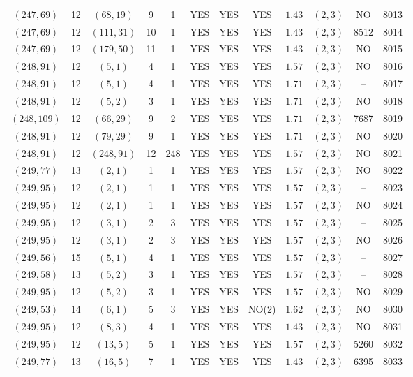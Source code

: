 \begin{longtable}{|c|c|c|c|c|c|c|c|c|c|c|c|}
$(247,69)$ & 12 & $(68,19)$ & 9 & 1 & YES & YES & YES & $1.43$ & $(2,3)$ & NO & 8013\\
$(247,69)$ & 12 & $(111,31)$ & 10 & 1 & YES & YES & YES & $1.43$ & $(2,3)$ & 8512 & 8014\\
$(247,69)$ & 12 & $(179,50)$ & 11 & 1 & YES & YES & YES & $1.43$ & $(2,3)$ & NO & 8015\\
$(248,91)$ & 12 & $(5,1)$ & 4 & 1 & YES & YES & YES & $1.57$ & $(2,3)$ & NO & 8016\\
$(248,91)$ & 12 & $(5,1)$ & 4 & 1 & YES & YES & YES & $1.71$ & $(2,3)$ & -- & 8017\\
$(248,91)$ & 12 & $(5,2)$ & 3 & 1 & YES & YES & YES & $1.71$ & $(2,3)$ & NO & 8018\\
$(248,109)$ & 12 & $(66,29)$ & 9 & 2 & YES & YES & YES & $1.71$ & $(2,3)$ & 7687 & 8019\\
$(248,91)$ & 12 & $(79,29)$ & 9 & 1 & YES & YES & YES & $1.71$ & $(2,3)$ & NO & 8020\\
$(248,91)$ & 12 & $(248,91)$ & 12 & 248 & YES & YES & YES & $1.57$ & $(2,3)$ & NO & 8021\\
$(249,77)$ & 13 & $(2,1)$ & 1 & 1 & YES & YES & YES & $1.57$ & $(2,3)$ & NO & 8022\\
$(249,95)$ & 12 & $(2,1)$ & 1 & 1 & YES & YES & YES & $1.57$ & $(2,3)$ & -- & 8023\\
$(249,95)$ & 12 & $(2,1)$ & 1 & 1 & YES & YES & YES & $1.57$ & $(2,3)$ & NO & 8024\\
$(249,95)$ & 12 & $(3,1)$ & 2 & 3 & YES & YES & YES & $1.57$ & $(2,3)$ & -- & 8025\\
$(249,95)$ & 12 & $(3,1)$ & 2 & 3 & YES & YES & YES & $1.57$ & $(2,3)$ & NO & 8026\\
$(249,56)$ & 15 & $(5,1)$ & 4 & 1 & YES & YES & YES & $1.57$ & $(2,3)$ & -- & 8027\\
$(249,58)$ & 13 & $(5,2)$ & 3 & 1 & YES & YES & YES & $1.57$ & $(2,3)$ & -- & 8028\\
$(249,95)$ & 12 & $(5,2)$ & 3 & 1 & YES & YES & YES & $1.57$ & $(2,3)$ & NO & 8029\\
$(249,53)$ & 14 & $(6,1)$ & 5 & 3 & YES & YES & NO(2) & $1.62$ & $(2,3)$ & NO & 8030\\
$(249,95)$ & 12 & $(8,3)$ & 4 & 1 & YES & YES & YES & $1.43$ & $(2,3)$ & NO & 8031\\
$(249,95)$ & 12 & $(13,5)$ & 5 & 1 & YES & YES & YES & $1.57$ & $(2,3)$ & 5260 & 8032\\
$(249,77)$ & 13 & $(16,5)$ & 7 & 1 & YES & YES & YES & $1.43$ & $(2,3)$ & 6395 & 8033\\

\end{longtable}
